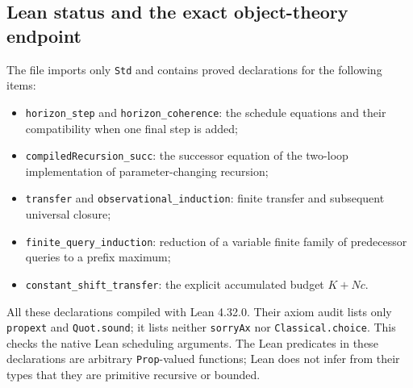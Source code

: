 \subsection{Lean status and the exact object-theory endpoint}
\label{subsec:backward-lean-status}

The file  imports only \texttt{Std} and
contains proved declarations for the following items:
\begin{itemize}
\item \texttt{horizon\_step} and \texttt{horizon\_coherence}: the schedule
  equations and their compatibility when one final step is added;
\item \texttt{compiledRecursion\_succ}: the successor equation of the
  two-loop implementation of parameter-changing recursion;
\item \texttt{transfer} and \texttt{observational\_induction}: finite
  transfer and subsequent universal closure;
\item \texttt{finite\_query\_induction}: reduction of a variable finite
  family of predecessor queries to a prefix maximum;
\item \texttt{constant\_shift\_transfer}: the explicit accumulated budget
  $K+Nc$.
\end{itemize}
All these declarations compiled with Lean 4.32.0.  Their axiom audit lists
only \texttt{propext} and \texttt{Quot.sound}; it lists neither
\texttt{sorryAx} nor \texttt{Classical.choice}.  This checks the native
Lean scheduling arguments.  The Lean predicates in these declarations
are arbitrary \texttt{Prop}-valued functions; Lean does not infer from
their types that they are primitive recursive or bounded.

